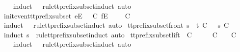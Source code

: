 \begin{isabellebody}
%
\isadelimproof
\ \ %
\endisadelimproof
%
\isatagproof
{}\isamarkupfalse%
\ {\isacharparenleft}induct\ {\isasymrho}\ {\isasymsigma}\ rule{\isacharcolon}tt{\isacharunderscore}prefix{\isacharunderscore}subset{\isachardot}induct{\isacharcomma}\ auto{\isacharparenright}%
\endisatagproof
{\isafoldproof}%
%
\isadelimproof
\isanewline
%
\endisadelimproof
\isanewline
{}\isamarkupfalse%
\ init{\isacharunderscore}event{\isacharunderscore}tt{\isacharunderscore}prefix{\isacharunderscore}subset{\isacharcolon}\ {\isachardoublequoteopen}{\isacharbrackleft}e{\isacharbrackright}\isactrlsub E\ {\isacharhash}\ {\isasymrho}\ {\isasymlesssim}\isactrlsub C\ {\isacharbrackleft}f{\isacharbrackright}\isactrlsub E\ {\isacharhash}\ {\isasymsigma}\ {\isasymLongrightarrow}\ {\isasymrho}\ {\isasymlesssim}\isactrlsub C\ {\isasymsigma}{\isachardoublequoteclose}\isanewline
%
\isadelimproof
\ \ %
\endisadelimproof
%
\isatagproof
{}\isamarkupfalse%
\ {\isacharparenleft}induct\ {\isasymrho}\ {\isasymsigma}\ rule{\isacharcolon}tt{\isacharunderscore}prefix{\isacharunderscore}subset{\isachardot}induct{\isacharcomma}\ auto{\isacharparenright}%
\endisatagproof
{\isafoldproof}%
%
\isadelimproof
\isanewline
%
\endisadelimproof
\isanewline
{}\isamarkupfalse%
\ tt{\isacharunderscore}prefix{\isacharunderscore}subset{\isacharunderscore}front{\isacharcolon}\ {\isachardoublequoteopen}s\ {\isacharat}\ t\ {\isasymlesssim}\isactrlsub C\ {\isasymsigma}\ {\isasymLongrightarrow}\ s\ {\isasymlesssim}\isactrlsub C\ {\isasymsigma}{\isachardoublequoteclose}\isanewline
%
\isadelimproof
\ \ %
\endisadelimproof
%
\isatagproof
{}\isamarkupfalse%
\ {\isacharparenleft}induct\ s\ {\isasymsigma}\ rule{\isacharcolon}tt{\isacharunderscore}prefix{\isacharunderscore}subset{\isachardot}induct{\isacharcomma}\ auto{\isacharparenright}%
\endisatagproof
{\isafoldproof}%
%
\isadelimproof
\isanewline
%
\endisadelimproof
\isanewline
{}\isamarkupfalse%
\ tt{\isacharunderscore}prefix{\isacharunderscore}subset{\isacharunderscore}lift{\isacharcolon}\ {\isachardoublequoteopen}{\isasymrho}\ {\isasymlesssim}\isactrlsub C\ {\isasymsigma}\ {\isasymLongrightarrow}\ {\isasymexists}\ {\isasymrho}{\isacharprime}{\isachardot}\ {\isasymrho}{\isacharprime}\ {\isasymle}\isactrlsub C\ {\isasymsigma}\ {\isasymand}\ {\isasymrho}\ {\isasymlesssim}\isactrlsub C\ {\isasymrho}{\isacharprime}{\isachardoublequoteclose}\isanewline
%
\isadelimproof
\ \ %
\endisadelimproof
%
\isatagproof
{}\isamarkupfalse%
\ {\isacharparenleft}induct\ {\isasymrho}\ {\isasymsigma}\ rule{\isacharcolon}tt{\isacharunderscore}prefix{\isacharunderscore}subset{\isachardot}induct{\isacharcomma}\ auto{\isacharparenright}\isanewline

\end{isabellebody}
